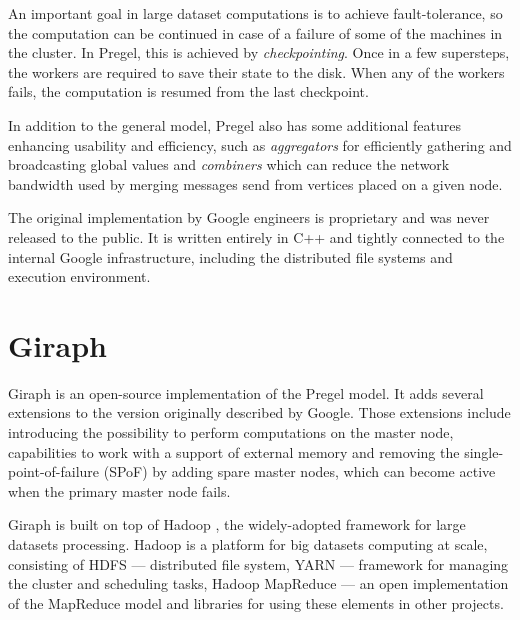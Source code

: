 An important goal in large dataset computations is to achieve fault-tolerance, so the computation can be continued in case of a failure of some of the machines in the cluster. In Pregel, this is achieved by \emph{checkpointing}. Once in a few supersteps, the workers are required to save their state to the disk. When any of the workers fails, the computation is resumed from the last checkpoint.

In addition to the general model, Pregel also has some additional features enhancing usability and efficiency, such as \emph{aggregators} for efficiently gathering and broadcasting global values and \emph{combiners} which can reduce the network bandwidth used by merging messages send from vertices placed on a given node.

The original implementation by Google engineers is proprietary and was never released to the public. It is written entirely in C++ and tightly connected to the internal Google infrastructure, including the distributed file systems and execution environment.

\section{Giraph}

Giraph \cite{giraph} is an open-source implementation of the Pregel model. It adds several extensions to the version originally described by Google. Those extensions include introducing the possibility to perform computations on the master node, capabilities to work with a support of external memory and removing the single-point-of-failure (SPoF) by adding spare master nodes, which can become active when the primary master node fails.

Giraph is built on top of Hadoop \cite{hadoop}, the widely-adopted framework for large datasets processing. Hadoop is a platform for big datasets computing at scale, consisting of HDFS --- distributed file system, YARN --- framework for managing the cluster and scheduling tasks, Hadoop MapReduce --- an open implementation of the MapReduce model and libraries for using these elements in other projects. 

